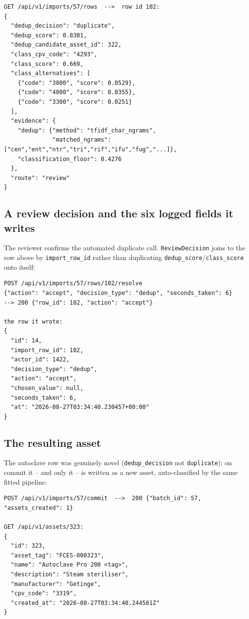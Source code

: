 \documentclass[11pt]{article}
\begin{document}
\begin{verbatim}
GET /api/v1/imports/57/rows  -->  row id 102:
{
  "dedup_decision": "duplicate",
  "dedup_score": 0.8301,
  "dedup_candidate_asset_id": 322,
  "class_cpv_code": "4293",
  "class_score": 0.669,
  "class_alternatives": [
    {"code": "3800", "score": 0.0529},
    {"code": "4800", "score": 0.0355},
    {"code": "3300", "score": 0.0251}
  ],
  "evidence": {
    "dedup": {"method": "tfidf_char_ngrams",
              "matched_ngrams": ["cen","ent","ntr","tri","rif","ifu","fug","...]},
    "classification_floor": 0.4276
  },
  "route": "review"
}
\end{verbatim}

\subsection{A review decision and the six logged fields it writes}

The reviewer confirms the automated duplicate call. \texttt{ReviewDecision} joins to the row
above by \texttt{import\_\allowbreak{}row\_\allowbreak{}id} rather than duplicating \texttt{dedup\_\allowbreak{}score}/\texttt{class\_\allowbreak{}score}
onto itself:

\begin{verbatim}
POST /api/v1/imports/57/rows/102/resolve
{"action": "accept", "decision_type": "dedup", "seconds_taken": 6}
--> 200 {"row_id": 102, "action": "accept"}

the row it wrote:
{
  "id": 14,
  "import_row_id": 102,
  "actor_id": 1422,
  "decision_type": "dedup",
  "action": "accept",
  "chosen_value": null,
  "seconds_taken": 6,
  "at": "2026-08-27T03:34:40.230457+00:00"
}
\end{verbatim}

\subsection{The resulting asset}

The autoclave row was genuinely novel (\texttt{dedup\_\allowbreak{}decision} not \texttt{duplicate}); on
commit it -- and only it -- is written as a new asset, auto-classified by the same fitted
pipeline:

\begin{verbatim}
POST /api/v1/imports/57/commit  -->  200 {"batch_id": 57, "assets_created": 1}

GET /api/v1/assets/323:
{
  "id": 323,
  "asset_tag": "FCES-000323",
  "name": "Autoclave Pro 200 <tag>",
  "description": "Steam steriliser",
  "manufacturer": "Getinge",
  "cpv_code": "3319",
  "created_at": "2026-08-27T03:34:40.244561Z"
}
\end{verbatim}
\end{document}
